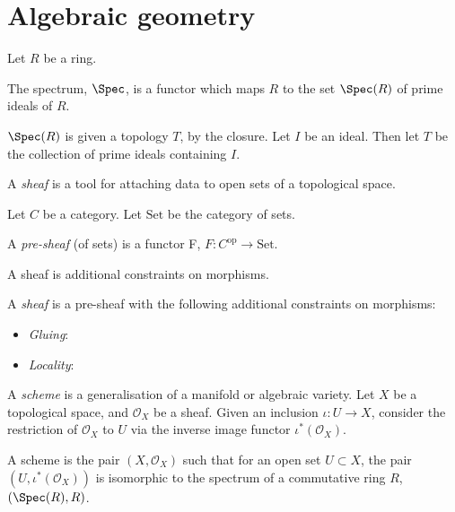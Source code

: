     \section{Algebraic geometry}
    
    
    Let \(R\) be a ring.
    \begin{defn}[spectrum]
    The spectrum, \( \Spec \), is a functor which maps \(R\) to the set \(\Spec(R)\) of prime ideals of \(R\). 
    \end{defn}
    \(\Spec(R)\) is given a topology \(T\), by the closure. Let \(I\) be an ideal. Then let \(T\) be the collection of prime ideals containing \(I\). 
    
    A \emph{sheaf} is a tool for attaching data to open sets of a topological space.
    
    Let \(C\) be a category. Let  \(\mathbf{\mathrm{Set}}\) be the category of sets. 
    
    \begin{defn} A \emph{pre-sheaf} (of sets) is a functor F, \( F : C^{\mathrm{op}} \rightarrow \mathbf{\mathrm{Set}}\).
    \end{defn}
    
    A sheaf is additional constraints on morphisms.
    
    \begin{defn}[sheaf]
    A \emph{sheaf} is a pre-sheaf with the following additional constraints on morphisms:
        \begin{itemize}
            \item \emph{Gluing}:
            \item \emph{Locality}:
        \end{itemize}
    \end{defn}
    
    A \emph{scheme} is a generalisation of a manifold or algebraic variety. 
    Let \(X\) be a topological space, and \( \mathcal{O}_X\) be a sheaf. Given an inclusion \( \iota : U \rightarrow X\), consider the restriction of \( \mathcal{O}_X\) to \(U\) via the inverse image functor \( \iota^* (\mathcal{O}_X)\).
    
    \begin{defn}[scheme]
    A scheme is the pair \( (X,\mathcal{O}_X)\) such that for an open set \(U \subset X\), the pair \( (U, \iota^*(\mathcal{O}_X))\) is isomorphic to the spectrum of a commutative ring \(R\), \( (\Spec(R), R)\).
    \end{defn}
    
    
